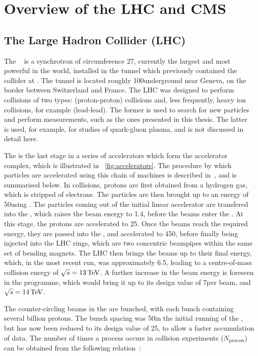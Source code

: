 \chapter{Overview of the LHC and CMS}
\label{chap:detector}
\section{The Large Hadron Collider (LHC)}
\label{sec:lhc}
The \LHC~\cite{LHC_machine} is a synchrotron of circumference 27\km, currently the largest and most powerful in the world, installed in the tunnel which previously contained the \LEP~\cite{lepdesign} collider at \CERN. The tunnel is located roughly 100\m underground near Geneva, on the border between Switzerland and France. The LHC was designed to perform collisions of two types: \pp (proton-proton) collisions and, less frequently, heavy ion collisions, for example \PbPb (lead-lead). The former is used to search for new particles and perform \SM measurements, such as the ones presented in this thesis. The latter is used, for example, for studies of quark-gluon plasma, and is not discussed in detail here. 

The \LHC is the last stage in a series of accelerators which form the \CERN accelerator complex, which is illustrated in \Fig~\ref{fig:accelerators}. The procedure by which particles are accelerated using this chain of machines is described in~\cite{LHC_machine}, and is summarised below. In \pp collisions, protons are first obtained from a hydrogen gas, which is stripped of electrons. The particles are then brought up to an energy of 50\MeV using \LINACTWO. The particles coming out of the initial linear accelerator are transfered into the \Booster, which raises the beam energy to 1.4\GeV, before the beams enter the \PS. At this stage, the protons are accelerated to 25\GeV. Once the beams reach the required energy, they are passed into the \SPS, and accelerated to 450\GeV, before finally being injected into the LHC rings, which are two concentric beampipes within the same set of bending magnets. The LHC then brings the beams up to their final energy, which, in the most recent run, was approximately 6.5\TeV, leading to a centre-of-mass collision energy of $\sqrt{s}=13\,\text{Te\hspace{-.08em}V}$. A further increase in the beam energy is foreseen in the \LHC programme, which would bring it up to its design value of 7\TeV per beam, and $\sqrt{s}=14\,\text{Te\hspace{-.08em}V}$.

The counter-circling beams in the \LHC are bunched, with each bunch containing several billion protons. The bunch spacing was 50\ns in the initial running of the \LHC, but has now been reduced to its design value of 25\ns, to allow a faster accumulation of data. The number of times a process occurs in collision experiments ($N_{\text{process}}$) can be obtained from the following relation~\cite{Benedikt:823808}:

